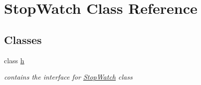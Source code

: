 \hypertarget{class_stop_watch}{\section{Stop\+Watch Class Reference}
\label{class_stop_watch}
}
\subsection*{Classes}
\begin{DoxyCompactItemize}
\item 
class \hyperlink{class_stop_watch_1_1h}{h}
\begin{DoxyCompactList}\small\item\em contains the interface for \hyperlink{class_stop_watch}{Stop\+Watch} class \end{DoxyCompactList}\end{DoxyCompactItemize}
